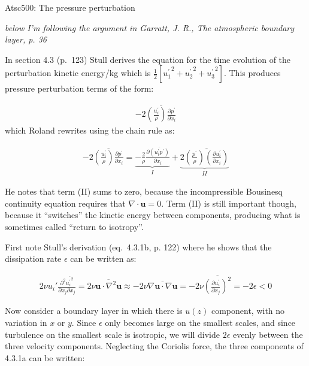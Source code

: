 \documentclass[12pt]{article}
\newcommand{\vect}[1]{\mathbf{{#1}}}
\begin{document}
\pagestyle{first}

\begin{center}
Atsc500: The pressure perturbation\\
\end{center}


\textit{below I'm following the argument in Garratt, J. R., The atmospheric boundary layer, p. 36}

In section 4.3 (p.~123) Stull derives the equation for the time evolution of 
the perturbation kinetic energy/kg  which is
 $\frac{1 }{2} \left [ {u_1^\prime}^2 + {u_2^\prime}^2 + {u_3^\prime}^2 \right ]$.  This produces 
pressure perturbation terms of the form:

\begin{gather}
  -2 \overline{  \left (  \frac{ {u_i^\prime}  }{ \rho}   \right )  \frac{\partial p^\prime  }{\partial x_i} }
\end{gather}
which Roland rewrites using the chain rule as:

\begin{gather}
    -2 \overline{  \left (  \frac{ {u_i^\prime}  }{ \rho}   \right )  \frac{\partial p^\prime  }{\partial x_i} }
=  \underbrace{  - \frac{2 }{\rho} \frac{\partial \overline{  (u_i^\prime p^\prime )}  }{\partial x_i }  }_I
+ \underbrace{
2 \overline{ \left (  \frac{p^\prime  }{\rho}  \right ) \left (  \frac{\partial   u_i^\prime }  {\partial x_i }  \right ) }}_{II}
\end{gather}

He notes that term (II) sums to zero, because the incompressible Bousinesq continuity
equation requires that $\nabla \cdot \vect{u} =0$.  Term (II) is still
important though, because it ``switches'' the kinetic energy between
components, producing what is sometimes called ``return to isotropy''.

First note Stull's derivation (eq.~4.3.1b, p. 122) where he shows that the dissipation rate $\epsilon$ 
can be written as: 

\begin{gather}
 2 \nu u_i\prime \frac{\partial^2 \overline{ {u_i^\prime}^2 } }{\partial x_j \partial x_j}     = 
2 \nu \overline{ \vect{u} \cdot \nabla^2 \vect{u}    }  \approx
- 2 \nu \overline{ \nabla \vect{u} \cdot \nabla \vect{u}    }
 = - 2 \nu \overline{ \left (  \frac{\partial u^\prime_i }{\partial x_j}  \right )^2 } = - 2 \epsilon < 0
\end{gather}

Now consider a boundary layer in which there is  $u(z)$ component, with no variation in $x$ or $y$.  
Since $\epsilon$ only
becomes large on the smallest scales, and since turbulence on the smallest scale is isotropic,
we will divide $2 \epsilon$ evenly between the three velocity components.  Neglecting the 
Coriolis force, the three components of 4.3.1a can be written:
\end{document}

